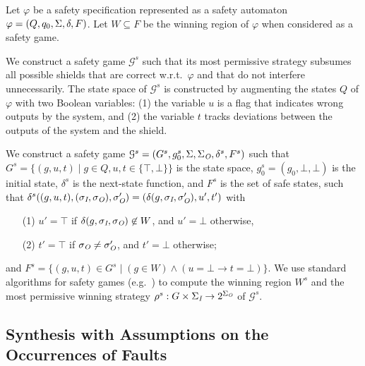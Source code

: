 Let $\varphi$ be a safety specification represented as a safety automaton $\varphi = (Q, q_0, \Sigma, \delta, F)$.
Let $W \subseteq F$ be the winning region of $\varphi$ when considered as a safety game.

We construct a safety game $\mathcal G^s$ such that its most permissive strategy subsumes all possible shields that are correct w.r.t.\ $\varphi$ and that do not interfere unnecessarily.
%
The state space of $\mathcal G^s$ is constructed by augmenting the states $Q$ of $\varphi$ with two Boolean variables:
(1) the variable $u$ is a flag that indicates wrong outputs by the system, and (2) the variable $t$ tracks deviations between the outputs of the system and the shield.

We construct a safety game $\mathcal G^s = (G^s, g_0^s,\Sigma,\Sigma_{\textit{O}},\delta^s, F^s)$ such that
$G^s = \{(g,u,t) \mid g \in Q, u, t \in \{\top,\bot\}\}$ is the state space,
$g_0^s = (g_0,\bot,\bot)$ is the initial state,
$\delta^s$ is the next-state function, and $F^s$ is the set of safe states, such that
$\delta^s((g,u,t),(\sigma_{\textit{I}},\sigma_{\textit{O}}),\sigma_{\textit{O}}')=(\delta(g,\sigma_{\textit{I}},\sigma_{\textit{O}}'),u',t')$
with
\begin{itemize}
\item[(1)] $u' = \top$ if $\delta(g,\sigma_{\textit{I}},\sigma_{\textit{O}}) \not \in W$, and $u' = \bot$ otherwise,
\item[(2)] $t' = \top$ if $\sigma_{\textit{O}}\neq \sigma_{\textit{O}}'$, and $t' = \bot$ otherwise;
\end{itemize}
and $F^s=\{(g,u,t)\in G^s \mid (g\in W) \wedge (u=\bot \rightarrow t=\bot)\}$.
We use standard algorithms for safety games (e.g.~\cite{Mazala01})
to compute the winning region $W^s$ and the most permissive winning strategy $\rho^s: G \times \Sigma_{\textit{I}} \rightarrow 2^{\Sigma_{\textit{O}}}$ of $\mathcal G^s$.

\subsection{Synthesis with Assumptions on the Occurrences of Faults}

